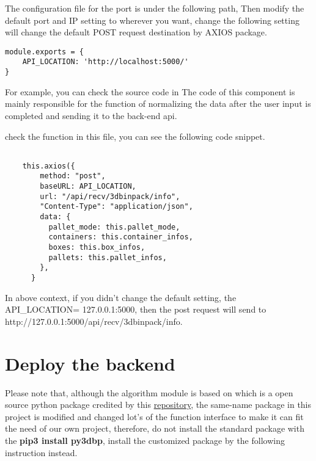 \documentclass{article}
\begin{document}
The configuration file for the port is under the following path,\newline
{}
Then modify the default port and IP setting to wherever you want, change the following setting will change the
default POST request destination by AXIOS package.

\begin{mdframed}[backgroundcolor=bg]
\begin{verbatim}
module.exports = {
    API_LOCATION: 'http://localhost:5000/'
}
\end{verbatim}
\end{mdframed}

For example, you can check the source code in
The code of this component is mainly responsible for the function of normalizing the data after the user input is completed and sending it to the back-end api.

check the  function in this file, you can see the following code snippet.

\begin{mdframed}[backgroundcolor=bg]
\begin{verbatim}

    this.axios({
        method: "post",
        baseURL: API_LOCATION,
        url: "/api/recv/3dbinpack/info",
        "Content-Type": "application/json",
        data: {
          pallet_mode: this.pallet_mode,
          containers: this.container_infos,
          boxes: this.box_infos,
          pallets: this.pallet_infos,
        },
      }
\end{verbatim}
\end{mdframed}

In above context,
if you didn't change the default setting, the API\_LOCATION= 127.0.0.1:5000, then the post request will send to http://127.0.0.1:5000/api/recv/3dbinpack/info.


\section{Deploy the backend}
Please note that, although the algorithm module is based on  which is a open source python package credited by this \href{https://github.com/enzoruiz/3dbinpacking}{\color{blue}repository}, the same-name package in this project is modified and changed lot's of the function interface to make it can fit the need of our own project, therefore, do not install the standard package with the \textbf{pip3 install py3dbp}, install the customized package by the following instruction instead.
\end{document}
